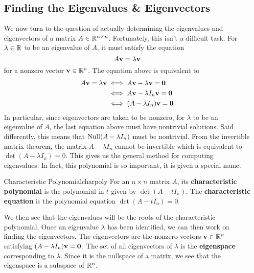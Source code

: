 \documentclass[mathshortcuts, colorful]{notes}
\begin{document}
    \subsection{Finding the Eigenvalues \& Eigenvectors}
    We now turn to the question of actually determining the eigenvalues and eigenvectors of a matrix $A \in \mathbb{R}^{n\times n}$. Fortunately, this isn't a difficult task. For $\lambda \in \mathbb{R}$ to be an eigenvalue of $A$, it must satisfy the equation 
    \begin{equation*}
        A \mathbf{v} = \lambda \mathbf{v} 
    \end{equation*}
    for a nonzero vector $\mathbf{v}\in \mathbb{R}^n$. The equation above is equivalent to 
    \begin{align*}
        A \mathbf{v} = \lambda \mathbf{v} &\iff A\mathbf{v} - \lambda \mathbf{v} = \mathbf{0} \\ 
        & \iff A \mathbf{v} - \lambda I_n \mathbf{v} = \mathbf{0} \\ 
        & \iff (A - \lambda I_n)\mathbf{v} = \mathbf{0}
    \end{align*}
    In particular, since eigenvectors are taken to be nonzero, for $\lambda$ to be an eigenvalue of $A$, the last equation above must have nontrivial solutions. Said differently, this means that $\operatorname{Null} (A - \lambda I_n)$ must be nontrivial. From the invertible matrix theorem, the matrix $A - \lambda I_n$ cannot be invertible which is equivalent to $\det (A - \lambda I_n) = 0$. This gives us the general method for computing eigenvalues. In fact, this polynomial is so important, it is given a special name. 
    \begin{cdefn}{Characteristic Polynomial}{charpoly}
        For an $n \times n$ matrix $A$, its \textbf{characteristic polynomial} is the polynomial in $t$ given by $\det (A - tI_n)$. The \textbf{characteristic equation} is the polynomial equation $\det(A - tI_n) = 0$. 
    \end{cdefn}
    We then see that the eigenvalues will be the roots of the characteristic polynomial. Once an eigenvalue $\lambda$ has been identified, we can then work on finding the eigenvectors. The eigenvectors are the nonzero vectors $\mathbf{v}\in \mathbb{R}^n$ satisfying $(A - \lambda I_n)\mathbf{v} = \mathbf{0}$. The set of all eigenvectors of $\lambda$ is the \textbf{eigenspace} corresponding to $\lambda$. Since it is the nullspace of a matrix, we see that the eigenspace is a subspace of $\mathbb{R}^n$. 
\end{document}
